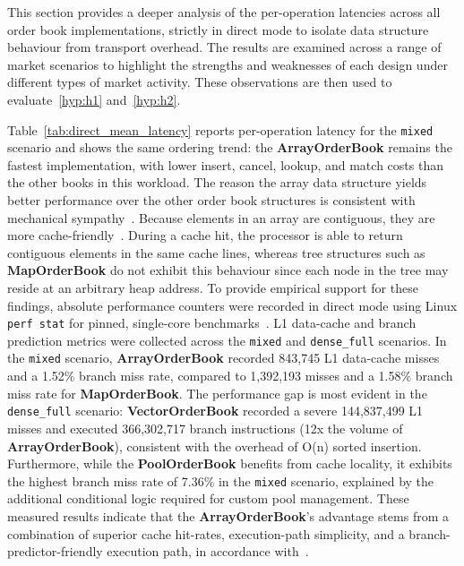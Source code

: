 This section provides a deeper analysis of the per-operation latencies across all
order book implementations, strictly in direct mode to isolate data structure
behaviour from transport overhead. The results are examined across a range of
market scenarios to highlight the strengths and weaknesses of each design
under different types of market activity. These observations are then used to
evaluate~\ref{hyp:h1} and~\ref{hyp:h2}.


Table~\ref{tab:direct_mean_latency} reports per-operation latency for the
\texttt{mixed} scenario and shows the same ordering trend: the
\textbf{ArrayOrderBook} remains the fastest implementation, with lower insert,
cancel, lookup, and match costs than the other books in this workload.
The reason the array data structure yields better performance over the other
order book structures is consistent with mechanical sympathy~\citep{thompson2011disruptor}. Because elements
in an array are contiguous, they are more cache-friendly~\citep{patterson2013cod}. During a cache hit,
the processor is able to return contiguous elements in the same cache lines,
whereas tree structures such as \textbf{MapOrderBook} do not exhibit this
behaviour since each node in the tree may reside at an arbitrary heap address.
To provide empirical support for these findings, absolute performance counters were
recorded in direct mode using Linux \texttt{perf stat} for pinned, single-core
benchmarks~\citep{linux_perf}. L1 data-cache and branch prediction metrics were
collected across the \texttt{mixed} and \texttt{dense\_full} scenarios.
In the \texttt{mixed} scenario, \textbf{ArrayOrderBook} recorded 843,745 L1 data-cache
misses and a 1.52\% branch miss rate, compared to 1,392,193 misses and a 1.58\%
branch miss rate for \textbf{MapOrderBook}.
The performance gap is most evident in the \texttt{dense\_full} scenario:
\textbf{VectorOrderBook} recorded a severe 144,837,499 L1 misses and
executed 366,302,717 branch instructions (12x the volume of \textbf{ArrayOrderBook}),
consistent with the overhead of O(n) sorted insertion.
Furthermore, while the \textbf{PoolOrderBook} benefits from cache locality, it
exhibits the highest branch miss rate of 7.36\% in the \texttt{mixed} scenario,
explained by the additional conditional logic required for custom pool management.
These measured results indicate that the \textbf{ArrayOrderBook}'s advantage
stems from a combination of superior cache hit-rates, execution-path simplicity,
and a branch-predictor-friendly
execution path, in accordance with~.

